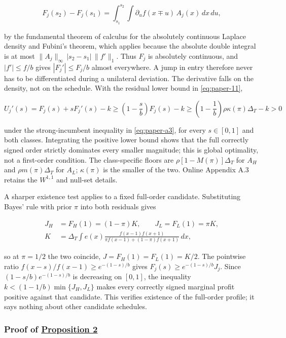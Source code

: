 \[
F_j(s_2)-F_j(s_1)
=\int_{s_1}^{s_2}\int \partial_u f(x\mp u)\,A_j(x)\,dx\,du,
\tag{A.5}\label{eq:paper-a-5}
\]

by the fundamental theorem of calculus for the absolutely continuous
Laplace density and Fubini's theorem, which applies because the absolute
double integral is at most \(\|A_j\|_\infty\,|s_2-s_1|\,\|f'\|_1\).
Thus \(F_j\) is absolutely continuous, and \(|f'|\le f/b\) gives
\(|F_j'|\le F_j/b\) almost everywhere. A jump in entry therefore never
has to be differentiated during a unilateral deviation. The derivative
falls on the density, not on the schedule. With the residual lower bound
in \eqref{eq:paper-11},

\[
U_j'(s)=F_j(s)+sF_j'(s)-k
\ge\left(1-\frac sb\right)F_j(s)-k
\ge\left(1-\frac1b\right)\rho\kappa(\pi)\Delta_T-k>0
\tag{A.6}\label{eq:paper-a-6}
\]

under the strong-incumbent inequality in \eqref{eq:paper-a3}, for every
\(s\in[0,1]\) and both classes. Integrating the positive lower bound
shows that the full correctly signed order strictly dominates every
smaller magnitude; this is global optimality, not a first-order
condition. The class-specific floors are \(\rho[1-M(\pi)]\Delta_T\) for
\(A_H\) and \(\rho m(\pi)\Delta_T\) for \(A_L\); \(\kappa(\pi)\) is the
smaller of the two. Online Appendix A.3 retains the \(W^{1,1}\) and
null-set details.

A sharper existence test applies to a fixed full-order candidate.
Substituting Bayes' rule with prior \(\pi\) into both residuals gives

\[
\begin{aligned}
J_H&=F_H(1)=(1-\pi)K,\qquad J_L=F_L(1)=\pi K,\\
K&=\Delta_T\int e(x)\frac{f(x-1)f(x+1)}{\pi f(x-1)+(1-\pi)f(x+1)}\,dx,
\end{aligned}
\tag{A.7}\label{eq:paper-a-7}
\]

so at \(\pi=1/2\) the two coincide, \(J=F_H(1)=F_L(1)=K/2\). The
pointwise ratio \(f(x-s)/f(x-1)\ge e^{-(1-s)/b}\) gives
\(F_j(s)\ge e^{-(1-s)/b}J_j\). Since \((1-s/b)e^{-(1-s)/b}\) is
decreasing on \([0,1]\), the inequality \(k<(1-1/b)\min\{J_H,J_L\}\)
makes every correctly signed marginal profit positive against that
candidate. This verifies existence of the full-order profile; it says
nothing about other candidate schedules.

\subsubsection{\texorpdfstring{Proof of
\hyperref[result-proposition-2]{Proposition
2}}{Proof of Proposition 2}}\label{proof-of-proposition-2}

